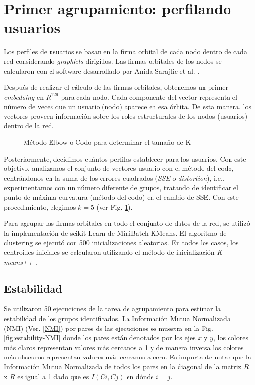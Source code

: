\section{Primer agrupamiento: perfilando usuarios}
Los perfiles de usuarios se basan en la firma orbital de cada nodo dentro de cada red considerando \textit{graphlets} dirigidos. Las firmas orbitales de los nodos se calcularon con el software desarrollado por Anida Sarajlic et al. \cite{sarajlic_graphlet-based_2016}. 

Después de realizar el cálculo de las firmas orbitales, obtenemos un primer \textit{embedding} en ${R}^{129}$ para cada nodo. Cada componente del vector representa el número de veces que un usuario (nodo) aparece en esa órbita. De esta manera, los vectores proveen información sobre los roles estructurales de los nodos (usuarios) dentro de la red.

 \begin{figure}[htbp]
   \centering
   
    \caption{Método Elbow o Codo para determinar el tamaño de K}
    \label{fig:elbowmethod}
\end{figure}

Posteriormente, decidimos cuántos perfiles establecer para los usuarios. Con este objetivo, analizamos el conjunto de vectores-usuario con el método del codo, centrándonos en la suma de los errores cuadrados (\textit{SSE} o \textit{distortion}), i.e., experimentamos con un número diferente de grupos, tratando de identificar el punto de máxima curvatura (método del codo) en el cambio de SSE. Con este procedimiento, elegimos $k = 5$ (ver Fig. \ref{fig:elbowmethod}).

Para agrupar las firmas orbitales en todo el conjunto de datos de la red, se utilizó la implementación de scikit-Learn de MiniBatch KMeans. El algoritmo de clustering se ejecutó con 500 inicializaciones aleatorias. En todos los casos, los centroides iniciales se calcularon utilizando el método de inicialización \textit{K-means++} \cite{arthur_k-means_nodate}. 

\subsection{Estabilidad}

Se utilizaron 50 ejecuciones de la tarea de agrupamiento para estimar la estabilidad de los grupos identificados. La Información Mutua Normalizada (NMI) (Ver. \ref{NMI}) por pares de las ejecuciones se muestra en la Fig. \ref{fig:estability-NMI} donde los pares están denotados por los ejes $x$ y $y$, los colores más claros representan valores más cercanos a 1 y de manera inversa los colores más obscuros representan valores más cercanos a cero. Es importante notar que la Información Mutua Normalizada de todos los pares en la diagonal de la matriz $R$ x $R$ es igual a 1 dado que es $I(Ci,Cj)$ en dónde $i=j$.

